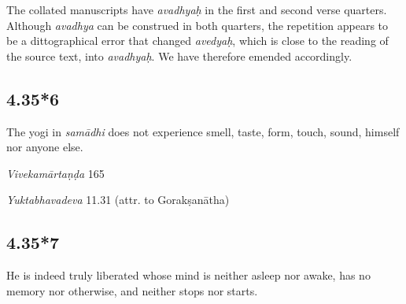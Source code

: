 \begin{ekdosis}
\begin{philcomm}[hp04_035_5]
The collated manuscripts have \emph{avadhyaḥ} in the first and second verse quarters. Although \emph{avadhya} can be construed in both quarters, the repetition appears to be a dittographical error that changed \emph{avedyaḥ}, which is close to the reading of the source text, into \emph{avadhyaḥ}. We have therefore emended accordingly. 
\end{philcomm}

\subsection*{4.35*6}
\begin{translation}[hp04_035_6]
The yogi in \textit{samādhi} does not experience smell, taste, form, touch, sound, himself nor anyone else.
\end{translation}

\begin{sources}[hp04_035_6]
\emph{Vivekamārtaṇḍa} 165
\begin{versinnote}
\end{versinnote}
\end{sources}

\begin{testimonia}[hp04_035_6]
\emph{Yuktabhavadeva} 11.31 (attr. to Gorakṣanātha)
\begin{versinnote}
\end{versinnote}
\end{testimonia}


\subsection*{4.35*7}
\begin{translation}[hp04_035_7]
He is indeed truly liberated whose mind is neither asleep nor awake, has no memory nor otherwise, and neither stops nor starts.
\end{translation}


\end{ekdosis}
